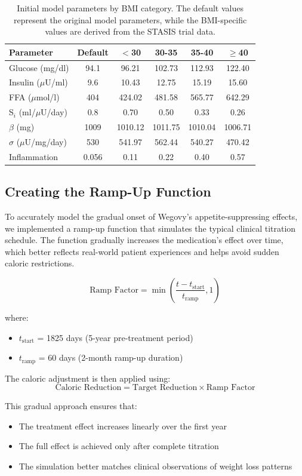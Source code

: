 \begin{table}[h]
\centering
\small  %
\begin{tabular}{|l|c|c|c|c|c|}
\hline
\textbf{Parameter} & \textbf{Default} & \textbf{$<$30} & \textbf{30-35} & \textbf{35-40} & \textbf{$\geq$40} \\
\hline
Glucose (mg/dl) & 94.1 & 96.21 & 102.73 & 112.93 & 122.40 \\
Insulin ($\mu$U/ml) & 9.6 & 10.43 & 12.75 & 15.19 & 15.60 \\
FFA ($\mu$mol/l) & 404 & 424.02 & 481.58 & 565.77 & 642.29 \\
S$_i$ (ml/$\mu$U/day) & 0.8 & 0.70 & 0.50 & 0.33 & 0.26 \\
$\beta$ (mg) & 1009 & 1010.12 & 1011.75 & 1010.04 & 1006.71 \\
$\sigma$ ($\mu$U/mg/day) & 530 & 541.97 & 562.44 & 540.27 & 470.42 \\
Inflammation & 0.056 & 0.11 & 0.22 & 0.40 & 0.57 \\
\hline
\end{tabular}
\caption{Initial model parameters by BMI category. The default values represent the original model parameters, while the BMI-specific values are derived from the STASIS trial data.}
\end{table}

\subsection{Creating the Ramp-Up Function}
To accurately model the gradual onset of Wegovy's appetite-suppressing effects, we implemented a ramp-up function that simulates the typical clinical titration schedule. The function gradually increases the medication's effect over time, which better reflects real-world patient experiences and helps avoid sudden caloric restrictions.

\begin{equation}
    \text{Ramp Factor} = \min\left(\frac{t - t_{\text{start}}}{t_{\text{ramp}}}, 1\right)
\end{equation}

where:
\begin{itemize}
    \item $t_{\text{start}}$ = 1825 days (5-year pre-treatment period)
    \item $t_{\text{ramp}}$ = 60 days (2-month ramp-up duration)
\end{itemize}

The caloric adjustment is then applied using:
\begin{equation}
    \text{Caloric Reduction} = \text{Target Reduction} \times \text{Ramp Factor}
\end{equation}

This gradual approach ensures that:
\begin{itemize}
    \item The treatment effect increases linearly over the first year
    \item The full effect is achieved only after complete titration
    \item The simulation better matches clinical observations of weight loss patterns
\end{itemize}


